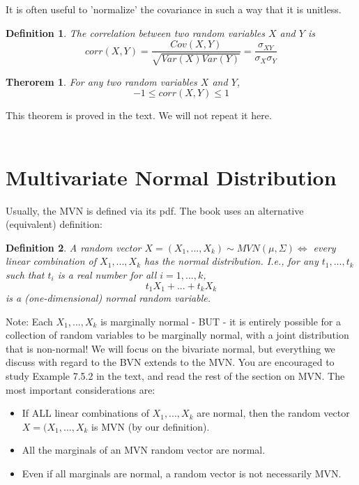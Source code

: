 \documentclass[12pt]{article} %
\newtheorem{defn}{Definition}
\newtheorem{thm}{Therorem}
\begin{document}
It is often useful to 'normalize' the covariance in such a way that it is unitless.

\begin{defn}
The correlation between two random variables $X$ and $Y$ is 
$$corr(X,Y) = \frac{Cov(X,Y)}{\sqrt{Var(X)Var(Y)}} = \frac{\sigma_{XY}}{\sigma_X\sigma_Y}$$
\end{defn}
\begin{thm}
For any two random variables $X$ and $Y$, 
$$-1\leq corr(X,Y)\leq 1$$
\end{thm}
This theorem is proved in the text. We will not repeat it here.\\\\

\section{Multivariate Normal Distribution}
Usually, the MVN is defined via its pdf. The book uses an alternative (equivalent) definition:
\begin{defn}
A random vector $X=(X_1,...,X_k) \sim MVN(\mu,\Sigma) \iff$ every linear combination of $X_1,...,X_k$ has the normal distribution. I.e., for any $t_1,...,t_k$ such that $t_i$ is a real number for all $i=1,...,k$, 
$$t_1X_1 +...+ t_kX_k$$
is a (one-dimensional) normal random variable.
\end{defn}
Note: Each $X_1,...,X_k$ is marginally normal - BUT - it is entirely possible for a collection of random variables to be marginally normal, with a joint distribution that is non-normal! We will focus on the bivariate normal, but everything we discuss with regard to the BVN extends to the MVN. You are encouraged to study Example 7.5.2 in the text, and read the rest of the section on MVN. The most important considerations are:
\begin{itemize}
\item If ALL linear combinations of $X_1,...,X_k$ are normal, then the random vector $X=(X_1,...,X_k$ is MVN (by our definition).
\item All the marginals of an MVN random vector are normal.
\item Even if all marginals are normal, a random vector is not necessarily MVN.
\end{itemize}
\end{document}
